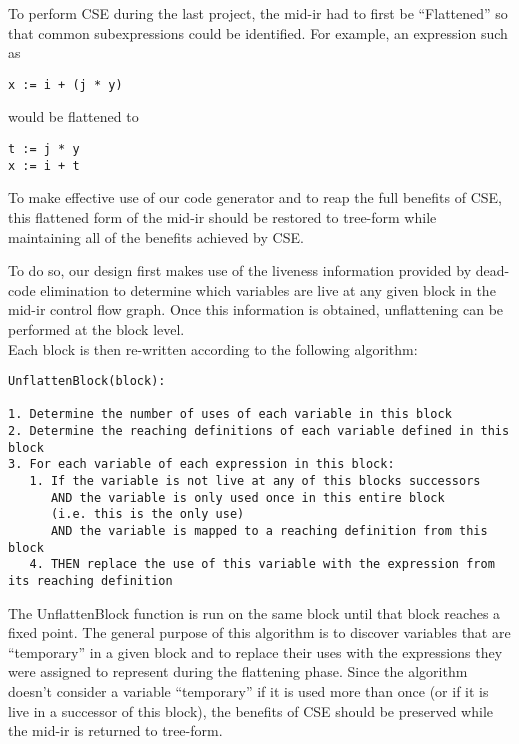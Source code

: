\documentclass[11pt]{article}
\begin{document}
To perform CSE during the last project, the mid-ir had to first be
``Flattened'' so that common subexpressions could be identified. For
example, an expression such as 

\begin{verbatim}
x := i + (j * y)
\end{verbatim} 

\noindent would be flattened to 

\begin{verbatim}
t := j * y 
x := i + t
\end{verbatim}

To make effective use of our code generator and to reap the full
benefits of CSE, this flattened form of the mid-ir should be restored
to tree-form while maintaining all of the benefits achieved by CSE. 

To do so, our design first makes use of the liveness information
provided by dead-code elimination to determine which variables are
live at any given block in the mid-ir control flow graph. Once this
information is obtained, unflattening can be performed at the block
level.\\


\noindent Each block is then re-written according to the following algorithm: 

\begin{verbatim}
UnflattenBlock(block):

1. Determine the number of uses of each variable in this block 
2. Determine the reaching definitions of each variable defined in this
block
3. For each variable of each expression in this block: 
   1. If the variable is not live at any of this blocks successors 
      AND the variable is only used once in this entire block 
      (i.e. this is the only use)
      AND the variable is mapped to a reaching definition from this block 
   4. THEN replace the use of this variable with the expression from
its reaching definition
\end{verbatim}

\noindent The UnflattenBlock function is run on the same block until that block
reaches a fixed point. The general purpose of this algorithm is to
discover variables that are ``temporary'' in a given block and to replace
their uses with the expressions they were assigned to represent during
the flattening phase. Since the algorithm doesn't consider a variable
``temporary'' if it is used more than once (or if it is live in a
successor of this block), the benefits of CSE should be preserved
while the mid-ir is returned to tree-form. 
\end{document}
